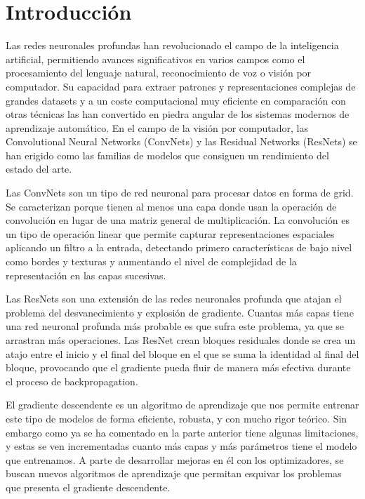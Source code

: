 \section{Introducción}

Las redes neuronales profundas han revolucionado el campo de la inteligencia artificial, permitiendo avances significativos en varios campos como el procesamiento del lenguaje natural, reconocimiento de voz o visión por computador. Su capacidad para extraer patrones y representaciones complejas de grandes datasets y a un coste computacional muy eficiente en comparación con otras técnicas las han convertido en piedra angular de los sistemas modernos de aprendizaje automático. En el campo de la visión por computador, las Convolutional Neural Networks (ConvNets) y las Residual Networks (ResNets) se han erigido como las familias de modelos que consiguen un rendimiento del estado del arte.

Las ConvNets son un tipo de red neuronal para procesar datos en forma de grid. Se caracterizan porque tienen al menos una capa donde usan la operación de convolución en lugar de una matriz general de multiplicación. La convolución es un tipo de operación linear que permite capturar representaciones espaciales aplicando un filtro a la entrada, detectando primero características de bajo nivel como bordes y texturas y aumentando el nivel de complejidad de la representación en las capas sucesivas.

Las ResNets son una extensión de las redes neuronales profunda que atajan el problema del desvanecimiento y explosión de gradiente. Cuantas más capas tiene una red neuronal profunda más probable es que sufra este problema, ya que se arrastran más operaciones. Las ResNet crean bloques residuales donde se crea un atajo entre el inicio y el final del bloque en el que se suma la identidad al final del bloque, provocando que el gradiente pueda fluir de manera más efectiva durante el proceso de backpropagation.

El gradiente descendente es un algoritmo de aprendizaje que nos permite entrenar este tipo de modelos de forma eficiente, robusta, y con mucho rigor teórico. Sin embargo como ya se ha comentado en la parte anterior tiene algunas limitaciones, y estas se ven incrementadas cuanto más capas y más parámetros tiene el modelo que entrenamos. A parte de desarrollar mejoras en él con los optimizadores, se buscan nuevos algoritmos de aprendizaje que permitan esquivar los problemas que presenta el gradiente descendente.


